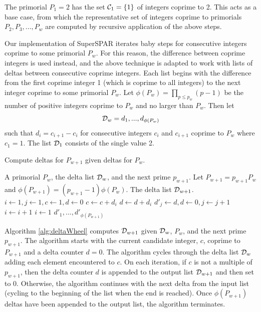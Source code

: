\documentclass{ucalgthes1}
\theoremstyle{definition}
\begin{document}
The primorial $P_1 = 2$ has the set $\mathcal C_1 = \{1\}$ of integers coprime to 2.  This acts as a base case, from which the representative set of integers coprime to primorials $P_2, P_3, ..., P_w$ are computed by recursive application of the above steps.

Our implementation of SuperSPAR iterates baby steps for consecutive integers coprime to some primorial $P_w$.  For this reason, the difference between coprime integers is used instead, and the above technique is adapted to work with lists of deltas between consecutive coprime integers.  Each list begins with the difference from the first coprime integer 1 (which is coprime to all integers) to the next integer coprime to some primorial $P_w$.   Let $\phi(P_w) = \prod_{p \le p_w}(p-1)$ be the number of positive integers coprime to $P_w$ and no larger than $P_w$.  Then let
\[
	\mathcal D_w = d_1, ..., d_{\phi(P_w)}
\]
such that $d_i = c_{i+1} - c_i$ for consecutive integers $c_i$ and $c_{i+1}$ coprime to $P_w$ where $c_1 = 1$. The list $\mathcal D_1$ consists of the single value 2.

\begin{algorithm}[htb]
\caption{Compute deltas for $P_{w+1}$ given deltas for $P_w$.}
\label{alg:deltaWheel}
\begin{algorithmic}[1]
\Require A primorial $P_w$, the delta list $\mathcal D_w$, and the next prime $p_{w+1}$.  Let $P_{w+1} = p_{w+1} P_w$ and $\phi(P_{w+1}) = (p_{w+1}-1)\phi(P_w)$.
\Ensure The delta list $\mathcal D_{w+1}$.
\State $i \gets 1, j \gets 1, c \gets 1, d \gets 0$
	\State $c \gets c + d_i$ 
	\State $d \gets d + d_i$
		\State $d'_j \gets d, d \gets 0, j \gets j + 1$ 
	\EndIf
	\State $i \gets i + 1$
		\State $i \gets 1$
	\EndIf
\EndWhile
\State \Return $d'_1, ..., d'_{\phi(P_{w+1})}$
\end{algorithmic}
\end{algorithm}

Algorithm \ref{alg:deltaWheel} computes $\mathcal D_{w+1}$ given $\mathcal D_w$, $P_w$, and the next prime $p_{w+1}$.  The algorithm starts with the current candidate integer, $c$, coprime to $P_{w+1}$ and a delta counter $d = 0$.  The algorithm cycles through the delta list $\mathcal D_w$ adding each element encountered to $c$.  On each iteration, if $c$ is not a multiple of $p_{w+1}$, then the delta counter $d$ is appended to the output list $\mathcal D_{w+1}$ and then set to 0.  Otherwise, the algorithm continues with the next delta from the input list (cycling to the beginning of the list when the end is reached).  Once $\phi(P_{w+1})$ deltas have been appended to the output list, the algorithm terminates.
\end{document}
